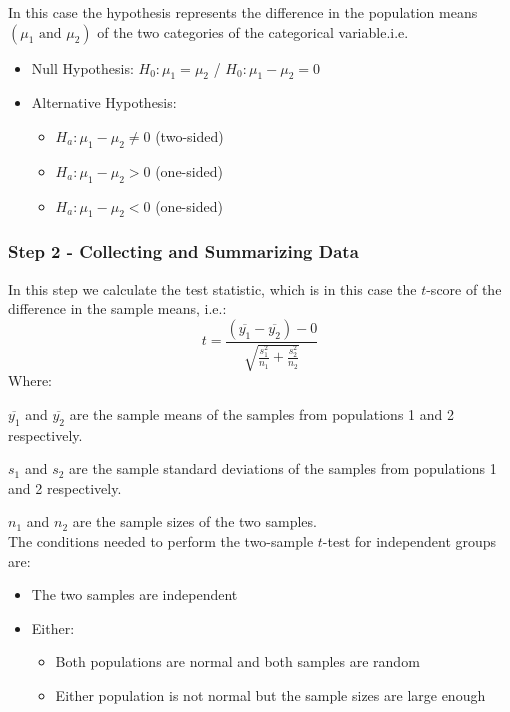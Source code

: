 \documentclass[12pt letter]{report}
\begin{document}
In this case the hypothesis represents the difference in the population means $\left( \mu_1 \text{ and } \mu_2  \right)
$ of the two categories of the categorical variable.i.e.
\begin{itemize}
  \item Null Hypothesis: $H_0: \mu_1 = \mu_2$ / $H_0: \mu_1 - \mu_2 = 0$
  \item Alternative Hypothesis:
        \begin{itemize}
          \item $H_a: \mu_1 - \mu_2 \neq 0$ (two-sided)
          \item $H_a: \mu_1 - \mu_2 > 0$ (one-sided)
          \item $H_a: \mu_1 - \mu_2 < 0$ (one-sided)
        \end{itemize}
\end{itemize}

\subsubsection{Step 2 - Collecting and Summarizing Data}
In this step we calculate the test statistic, which is in this case the $t$-score of the difference in the sample means,
i.e.:
\[
  t = \frac{\left( \overline{y_1} - \overline{y_2} \right) - 0 }{\sqrt{\frac{s^2_1}{n_1} + \frac{s^2_2}{n_2}}}
\]
Where:

$\overline{y_1}$ and $\overline{y_2}$ are the sample means of the samples from populations 1 and 2 respectively.

$s_1$ and $s_2$ are the sample standard deviations of the samples from populations 1 and 2 respectively.

$n_1$ and $n_2$ are the sample sizes of the two samples.
\\


The conditions needed to perform the two-sample $t$-test for independent groups are:
\begin{itemize}
  \item The two samples are independent
  \item Either:
        \begin{itemize}
          \item Both populations are normal and both samples are random
          \item Either population is not normal but the sample sizes are large enough
        \end{itemize}
\end{itemize}
\end{document}
